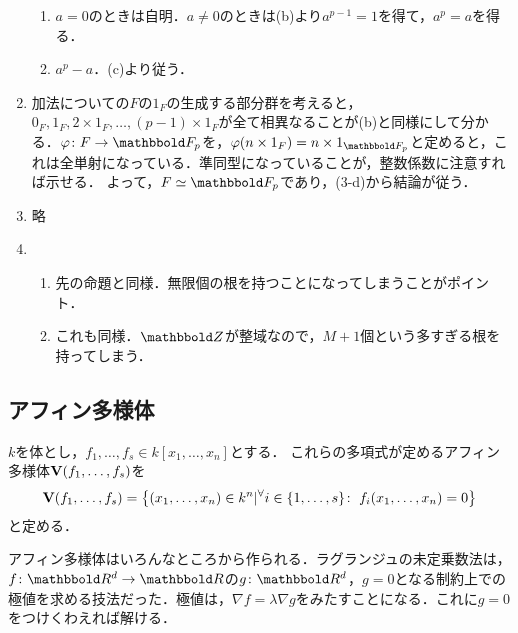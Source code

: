 \documentclass[9pt]{ltjsarticle}
\newcommand{\bbold}{\mathbbold}
\theoremstyle{break}
\theoremstyle{break}
\theoremstyle{break}
\theoremstyle{break}
\theoremstyle{break}
\theoremstyle{break}
\theoremstyle{break}
\theoremstyle{break}
\theoremstyle{break}
\theoremstyle{break}
\theoremstyle{break}
\theoremstyle{break}
\theoremstyle{break}
\theoremstyle{break}
\theoremstyle{break}
\theoremstyle{nonumberbreak}
\theoremstyle{nonumberbreak}
\begin{document}
\begin{enumerate}[label=(問題\arabic*)]
\begin{enumerate}
 \item $a=0$のときは自明．$a\neq 0$のときは(b)より$a^{p-1}=1$を得て，$a^p=a$を得る．
 \item $a^p-a$．(c)より従う．
\end{enumerate}
 \item 加法についての$F$の$1_F$の生成する部分群を考えると，$0_F,1_F,2\times 1_F,\dots,(p-1)\times 1_F$が全て相異なることが(b)と同様にして分かる．$\varphi\colon F\to \bbold F_p$を，$\varphi(n\times 1_F)=n\times 1_{\bbold F_p}$と定めると，これは全単射になっている．準同型になっていることが，整数係数に注意すれば示せる．
よって，$F\simeq \bbold F_p$であり，(3-d)から結論が従う．
 \item 略
 \item
\begin{enumerate}[label=(\arabic*)]
 \item 先の命題と同様．無限個の根を持つことになってしまうことがポイント．
 \item これも同様．$\Z$が整域なので，$M+1$個という多すぎる根を持ってしまう．
\end{enumerate}
\end{enumerate}

\subsection{アフィン多様体}
$k$を体とし，$f_1,\dots,f_s \in k[x_1,\dots,x_n]$とする．
これらの多項式が定めるアフィン多様体$\textbf V(f_1,\dots,f_s)$を
\begin{align}
 \textbf V(f_1,\dots,f_s) =
\left\{(x_1,\dots,x_n)\in k^n | {}^{\forall}{i\in \left\{1,\dots,s\right\}}\mathrm{\colon\;} f_i(x_1,\dots,x_n)=0\right\}
\end{align}
と定める．

アフィン多様体はいろんなところから作られる．ラグランジュの未定乗数法は，
$f\colon \R^d \to \R$の$g\colon \R^d$，$g=0$となる制約上での
極値を求める技法だった．極値は，$\nabla f = \lambda \nabla g$をみたすことになる．これに$g=0$をつけくわえれば解ける．
\end{document}
